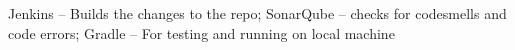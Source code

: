 \documentclass[number]{assignment}
\begin{document}
\begin{landscape}
\begin{multicols}{3}
Jenkins -- Builds the changes to the repo; SonarQube -- checks for codesmells and code errors; Gradle -- For testing and running on local machine\\

\end{multicols}
\end{landscape}
\end{document}
